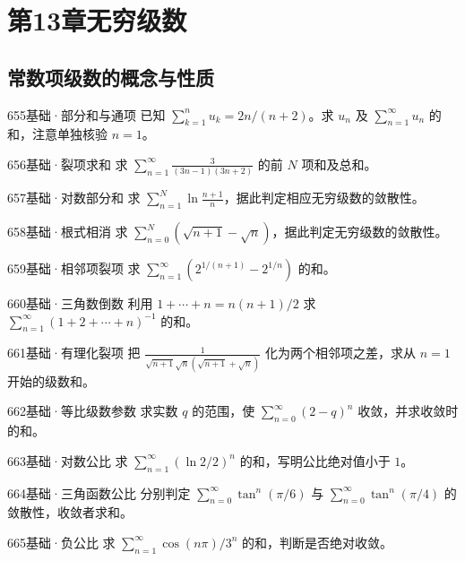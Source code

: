 \section{第13章\quad 无穷级数}
\subsection{常数项级数的概念与性质}
\begin{exercise}{655}{基础·部分和与通项}
已知 $\sum_{k=1}^nu_k=2n/(n+2)$。求 $u_n$ 及 $\sum_{n=1}^{\infty}u_n$ 的和，注意单独核验 $n=1$。
\end{exercise}
\begin{exercise}{656}{基础·裂项求和}
求 $\sum_{n=1}^{\infty}\frac3{(3n-1)(3n+2)}$ 的前 $N$ 项和及总和。
\end{exercise}
\begin{exercise}{657}{基础·对数部分和}
求 $\sum_{n=1}^N\ln\frac{n+1}{n}$，据此判定相应无穷级数的敛散性。
\end{exercise}
\begin{exercise}{658}{基础·根式相消}
求 $\sum_{n=0}^N(\sqrt{n+1}-\sqrt n)$，据此判定无穷级数的敛散性。
\end{exercise}
\begin{exercise}{659}{基础·相邻项裂项}
求 $\sum_{n=1}^{\infty}(2^{1/(n+1)}-2^{1/n})$ 的和。
\end{exercise}
\begin{exercise}{660}{基础·三角数倒数}
利用 $1+\cdots+n=n(n+1)/2$ 求 $\sum_{n=1}^{\infty}(1+2+\cdots+n)^{-1}$ 的和。
\end{exercise}
\begin{exercise}{661}{基础·有理化裂项}
把 $\frac1{\sqrt{n+1}\sqrt n(\sqrt{n+1}+\sqrt n)}$ 化为两个相邻项之差，求从 $n=1$ 开始的级数和。
\end{exercise}
\begin{exercise}{662}{基础·等比级数参数}
求实数 $q$ 的范围，使 $\sum_{n=0}^{\infty}(2-q)^n$ 收敛，并求收敛时的和。
\end{exercise}
\begin{exercise}{663}{基础·对数公比}
求 $\sum_{n=1}^{\infty}(\ln2/2)^n$ 的和，写明公比绝对值小于 $1$。
\end{exercise}
\begin{exercise}{664}{基础·三角函数公比}
分别判定 $\sum_{n=0}^{\infty}\tan^n(\pi/6)$ 与 $\sum_{n=0}^{\infty}\tan^n(\pi/4)$ 的敛散性，收敛者求和。
\end{exercise}
\begin{exercise}{665}{基础·负公比}
求 $\sum_{n=1}^{\infty}\cos(n\pi)/3^n$ 的和，判断是否绝对收敛。
\end{exercise}
